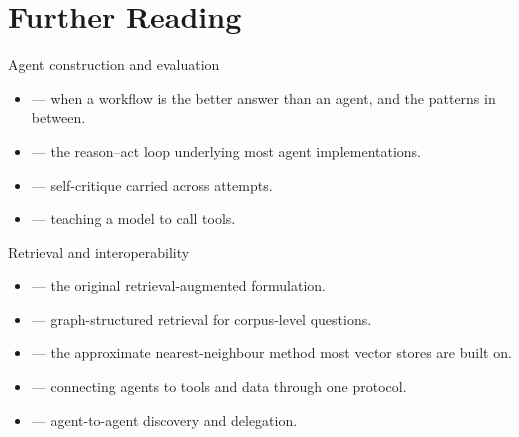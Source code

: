 
\section{Further Reading}

\begin{v3topic}{Agent construction and evaluation}
\begin{itemize}
  \item {} --- when a workflow is
    the better answer than an agent, and the patterns in between.
  \item {} --- the reason--act loop
    underlying most agent implementations.
  \item {} --- self-critique carried
    across attempts.
  \item {} --- teaching a model to
    call tools.
\end{itemize}
\end{v3topic}

\begin{v3topic}{Retrieval and interoperability}
\begin{itemize}
  \item {} --- the original
    retrieval-augmented formulation.
  \item {} --- graph-structured retrieval for
    corpus-level questions.
  \item {} --- the approximate
    nearest-neighbour method most vector stores are built on.
  \item {} --- connecting agents to
    tools and data through one protocol.
  \item {} --- agent-to-agent discovery and
    delegation.
\end{itemize}
\end{v3topic}
